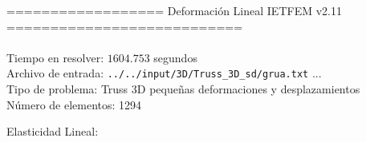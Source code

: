 \documentclass[a4paper,11pt]{article}
\begin{document}

================== Deformación Lineal IETFEM v2.11 ===========================\\\\


Tiempo en resolver: $1604.753$ segundos \\

Archivo de entrada: \verb|../../input/3D/Truss_3D_sd/grua.txt|  ... \\

Tipo de problema: Truss 3D pequeñas deformaciones y desplazamientos\\ 

Número de elementos: 1294 \\

\newpage       

Elasticidad Lineal:\\
\end{document}
